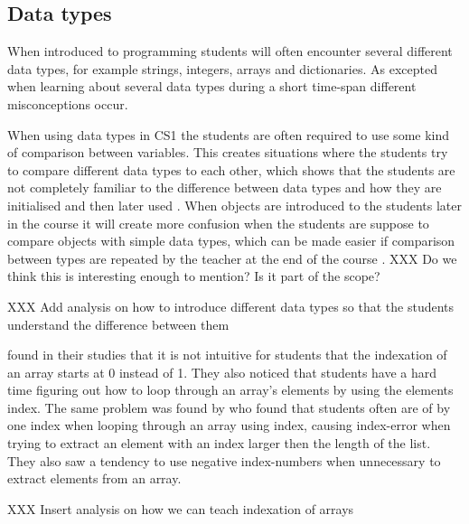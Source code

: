 \subsection{Data types}

When introduced to programming students will often encounter several different data types, for example strings, integers, arrays and dictionaries. As excepted when learning about several data types during a short time-span different misconceptions occur. 

When using data types in CS1 the students are often required to use some kind of comparison between variables. This creates situations where the students try to compare different data types to each other, which shows that the students are not completely familiar to the difference between data types and how they are initialised and then later used \parencite{Kurvinen2016}. When objects are introduced to the students later in the course it will create more confusion when the students are suppose to compare objects with simple data types, which can be made easier if comparison between types are repeated by the teacher at the end of the course \parencite{Kurvinen2016}. XXX Do we think this is interesting enough to mention? Is it part of the scope?

XXX Add analysis on how to introduce different data types so that the students understand the difference between them


 \textcite{Kurvinen2016} found in their studies that it is not intuitive for students that the indexation of an array starts at 0 instead of 1. They also noticed that students have a hard time figuring out how to loop through an array's elements by using the elements index. The same problem was found by \textcite{KumarVeerasamy2016} who found that students often are of by one index when looping through an array using index, causing index-error when trying to extract an element with an index larger then the length of the list. They also saw a tendency to use negative index-numbers when unnecessary to extract elements from an array.

 XXX Insert analysis on how we can teach indexation of arrays



